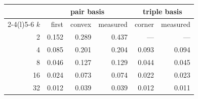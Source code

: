 \footnotesize
\begin{tabular}{rrrrrr}
\toprule
& \multicolumn{3}{c}{pair basis} & \multicolumn{2}{c}{triple basis} \\ \cmidrule(lr){2-4}\cmidrule(l){5-6}
$k$ & first & convex & measured & corner & measured \\
\midrule
2 & 0.152 & 0.289 & 0.437 & --- & --- \\
4 & 0.085 & 0.201 & 0.204 & 0.093 & 0.094 \\
8 & 0.046 & 0.127 & 0.129 & 0.044 & 0.045 \\
16 & 0.024 & 0.073 & 0.074 & 0.022 & 0.023 \\
32 & 0.012 & 0.039 & 0.039 & 0.012 & 0.011 \\
\bottomrule
\end{tabular}
